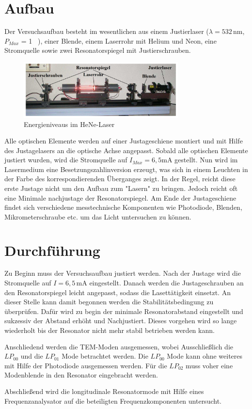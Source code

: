 \section{Aufbau}
Der Versuchsaufbau besteht im wesentlichen aus einem Justierlaser ($\lambda = 532\,\text{nm}$, $P_{Max}$ = 1 \, ), einer Blende, einem Laserrohr mit Helium und Neon, eine Stromquelle
sowie zwei Resonatorspiegel mit Justierschrauben. 

\begin{figure}
  \centering
  \includegraphics[width=0.75\textwidth]{img/aufbau.png}
  \caption{Energieniveaus im HeNe-Laser}
  \label{abb:aufbau}
\end{figure}

Alle optischen Elemente werden auf einer Justageschiene montiert und mit Hilfe des Justagelasers an die optische Achse angepasst.
Sobald alle optischen Elemente justiert wurden, wird die Stromquelle auf $I_{Max} = 6,5 \text{mA}$ gestellt. Nun wird im Lasermedium
eine Besetzungszahlinversion erzeugt, was sich in einem Leuchten in der Farbe des korrespondierenden Überganges zeigt. In der Regel,
reicht diese erste Justage nicht um den Aufbau zum "Lasern" zu bringen. Jedoch reicht oft eine Minimale nachjustage der Resonatorspiegel.
Am Ende der Justageschiene findet sich verschiedene messtechnische Komponenten wie Photodiode, Blenden, Mikrometerschraube etc. 
um das Licht untersuchen zu können.

\section{Durchführung}
Zu Beginn muss der Versuchsaufbau justiert werden. Nach der Justage wird die Stromquelle auf $I = 6,5 \, \text{mA}$ eingestellt.
Danach werden die Justageschrauben an den Resonatorspiegel leicht angepasst, sodass die Lasettätigkeit einsetzt. An dieser Stelle
kann damit begonnen werden die Stabilitätsbedingung zu überprüfen. Dafür wird zu begin der minimale Resonatorabstand eingestellt
und sukzessiv der Abstand erhöht und Nachjustiert. Dieses vorgehen wird so lange wiederholt bis der Resonator nicht mehr stabil
betrieben werden kann.

Anschliedend werden die TEM-Moden ausgemessen, wobei Ausschließlich die $LP_{00}$ und die $LP_{01}$ Mode betrachtet werden.
Die $LP_{00}$ Mode kann ohne weiteres mit Hilfe der Photodiode ausgemessen werden. Für die $LP_{02}$ muss voher eine Modenblende in den 
Resonator eingebracht werden. 

Abschließend wird die longitudinale Resonatormode mit Hilfe eines Frequenzanalysator auf die beteiligten Frequenzkomponenten untersucht.


